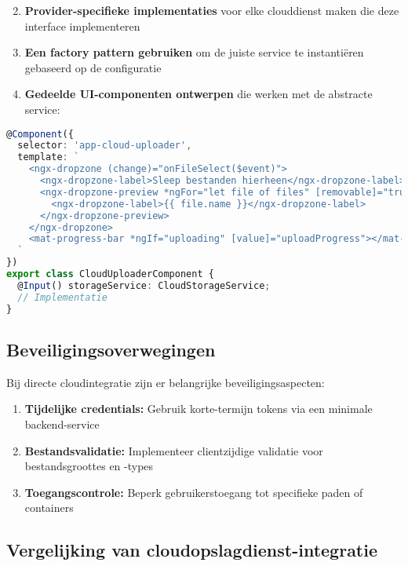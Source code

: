 \begin{enumerate}
\setcounter{enumi}{1}
    \item \textbf{Provider-specifieke implementaties} voor elke clouddienst maken die deze interface implementeren
    \item \textbf{Een factory pattern gebruiken} om de juiste service te instantiëren gebaseerd op de configuratie
    \item \textbf{Gedeelde UI-componenten ontwerpen} die werken met de abstracte service:
\end{enumerate}

\begin{lstlisting}[language=TypeScript, caption=Herbruikbare cloud uploader component]
@Component({
  selector: 'app-cloud-uploader',
  template: `
    <ngx-dropzone (change)="onFileSelect($event)">
      <ngx-dropzone-label>Sleep bestanden hierheen</ngx-dropzone-label>
      <ngx-dropzone-preview *ngFor="let file of files" [removable]="true" (removed)="onRemove(file)">
        <ngx-dropzone-label>{{ file.name }}</ngx-dropzone-label>
      </ngx-dropzone-preview>
    </ngx-dropzone>
    <mat-progress-bar *ngIf="uploading" [value]="uploadProgress"></mat-progress-bar>
  `
})
export class CloudUploaderComponent {
  @Input() storageService: CloudStorageService;
  // Implementatie
}
\end{lstlisting}

\subsection{Beveiligingsoverwegingen}

Bij directe cloudintegratie zijn er belangrijke beveiligingsaspecten:

\begin{enumerate}
    \item \textbf{Tijdelijke credentials:} Gebruik korte-termijn tokens via een minimale backend-service
    \item \textbf{Bestandsvalidatie:} Implementeer clientzijdige validatie voor bestandsgroottes en -types
    \item \textbf{Toegangscontrole:} Beperk gebruikerstoegang tot specifieke paden of containers
\end{enumerate}

\subsection{Vergelijking van cloudopslagdienst-integratie}

